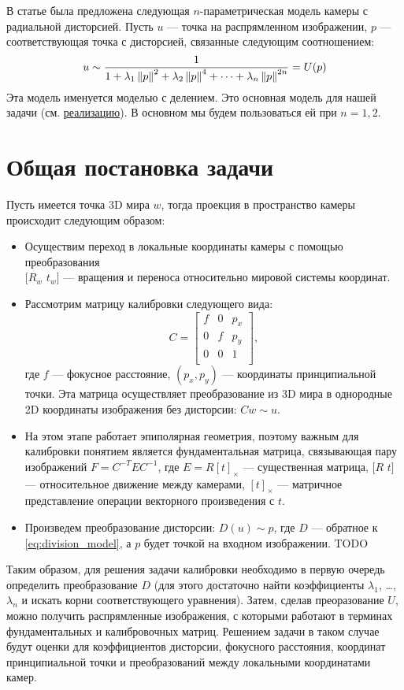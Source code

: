 \label{model}
В статье \cite{Fitzgibbon01b} была предложена следующая $n$-параметрическая модель камеры с радиальной дисторсией. Пусть $u$ --- точка на распрямленном изображении, $p$ --- соответствующая точка с дисторсией, связанные следующим соотношением:
\begin{equation}
	u \sim \frac{1}{1 + \lambda_1\left\lVert p\right\rVert^2 + \lambda_2\left\lVert p\right\rVert^4 + \cdots + \lambda_n\left\lVert p\right\rVert^{2n}} = U(p) \label{eq:division_model}
\end{equation} 
Эта модель именуется моделью с делением. Это основная модель для нашей задачи (см. \href{https://github.com/QuantumMechanicus/camera_calibration/blob/dev/core/scene/Intrinsics.h}{реализацию}). В основном мы будем пользоваться ей при $n = 1, 2$.

\section{Общая постановка задачи}
Пусть имеется точка 3D мира $w$, тогда проекция в пространство камеры происходит следующим образом:
\begin{itemize}
	\item Осуществим переход в локальные координаты камеры с помощью преобразования \\$[R_w$ $t_w]$ --- вращения и переноса относительно мировой системы координат.
	\item Рассмотрим матрицу калибровки следующего вида: 
	\begin{equation}
		C = \begin{bmatrix}
		f & 0 & p_x \\
		0 & f & p_y \\
		0 & 0 & 1 \\
		\end{bmatrix}, 
	\end{equation}
	где $f$ --- фокусное расстояние,  $\left(p_x, p_y\right)$ --- координаты принципиальной точки. Эта матрица осуществляет преобразование из 3D мира в однородные 2D координаты изображения без дисторсии: $Cw \sim u$. 
	\item На этом этапе работает эпиполярная геометрия, поэтому важным для калибровки понятием является фундаментальная матрица, связывающая пару изображений $F = C^{-T}EC^{-1}$, где $E = R [t]_{\times}$ --- существенная матрица, $[R$ $t]$ ---  относительное движение между камерами, $[t]_{\times}$ --- матричное представление операции векторного произведения с $t$.   
	\item Произведем преобразование дисторсии: $D(u) \sim p$, где $D$ --- обратное к \eqref{eq:division_model}, а $p$ будет точкой на входном изображении. TODO
\end{itemize} 
Таким образом, для решения задачи калибровки необходимо в первую очередь определить преобразование $D$ (для этого достаточно найти коэффициенты $\lambda_1$, \dots, $\lambda_n$ и искать корни соответствующего уравнения). Затем, сделав преоразование $U$, можно получить распрямленные изображения, с которыми работают в терминах фундаментальных и калибровочных матриц. Решением задачи в таком случае будут оценки для коэффициентов дисторсии, фокусного расстояния, координат принципиальной точки и преобразований между локальными координатами камер.

